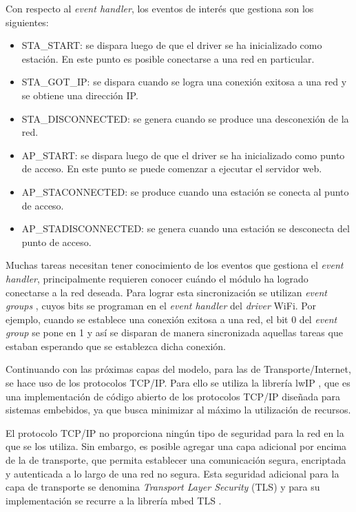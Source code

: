 Con respecto al \emph{event handler}, los eventos de interés que gestiona son los siguientes:

\begin{itemize}
	\item STA\_START: se dispara luego de que el driver se ha inicializado como estación. En este punto es posible conectarse a una red en particular.
	\item STA\_GOT\_IP: se dispara cuando se logra una conexión exitosa a una red y se obtiene una dirección IP.
	\item STA\_DISCONNECTED: se genera cuando se produce una desconexión de la red.
	\item AP\_START: se dispara luego de que el driver se ha inicializado como punto de acceso. En este punto se puede comenzar a ejecutar el servidor web.
	\item AP\_STACONNECTED: se produce cuando una estación se conecta al punto de acceso.
	\item AP\_STADISCONNECTED: se genera cuando una estación se desconecta del punto de acceso.
\end{itemize}

Muchas tareas necesitan tener conocimiento de los eventos que gestiona el \emph{event handler}, principalmente requieren conocer cuándo el módulo ha logrado conectarse a la red deseada. Para lograr esta sincronización se utilizan \emph{event groups} \citep{event_groups}, cuyos bits se programan en el \emph{event handler} del \emph{driver} WiFi. Por ejemplo, cuando se establece una conexión exitosa a una red, el bit 0 del \emph{event group} se pone en 1 y así se disparan de manera sincronizada aquellas tareas que estaban esperando que se establezca dicha conexión.

Continuando con las próximas capas del modelo, para las de Transporte/Internet, se hace uso de los protocolos TCP/IP. Para ello se utiliza la librería lwIP \citep{lwip}, que es una implementación de código abierto de los protocolos TCP/IP diseñada para sistemas embebidos, ya que busca minimizar al máximo la utilización de recursos.

El protocolo TCP/IP no proporciona ningún tipo de seguridad para la red en la que se los utiliza. Sin embargo, es posible agregar una capa adicional por encima de la de transporte, que permita establecer una comunicación segura, encriptada y autenticada a lo largo de una red no segura. Esta seguridad adicional para la capa de transporte se denomina \emph{Transport Layer Security} (TLS) \citep{tls} y para su implementación se recurre a la librería mbed TLS \citep{mbed_tls}.

